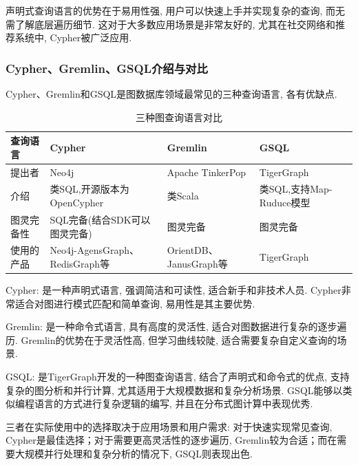 
声明式查询语言的优势在于易用性强, 用户可以快速上手并实现复杂的查询, 而无需了解底层遍历细节. 这对于大多数应用场景是非常友好的, 尤其在社交网络和推荐系统中, Cypher被广泛应用.

\subsubsection*{Cypher、Gremlin、GSQL介绍与对比}
Cypher、Gremlin和GSQL是图数据库领域最常见的三种查询语言, 各有优缺点.
\begin{table}[htbp]
	\centering
	\caption{三种图查询语言对比}
	\begin{tabularx}{\textwidth}{|X|X|X|X| }
		\hline
		查询语言  & Cypher                       & Gremlin              & GSQL                \\
		\hline
		提出者   & Neo4j                        & Apache TinkerPop     & TigerGraph          \\
		\hline
		介绍    & 类SQL,开源版本为OpenCypher         & 类Scala               & 类SQL,支持Map-Ruduce模型 \\
		\hline
		图灵完备性 & SQL完备(结合SDK可以图灵完备)           & 图灵完备                 & 图灵完备                \\
		\hline
		使用的产品 & Neo4j-AgensGraph、RedisGraph等 & OrientDB、JanusGraph等 & TigerGraph          \\
		\hline
	\end{tabularx}%
	\label{tab:addlabel}%
\end{table}%

Cypher: 是一种声明式语言, 强调简洁和可读性, 适合新手和非技术人员. Cypher非常适合对图进行模式匹配和简单查询, 易用性是其主要优势.

Gremlin: 是一种命令式语言, 具有高度的灵活性, 适合对图数据进行复杂的逐步遍历. Gremlin的优势在于灵活性高, 但学习曲线较陡, 适合需要复杂自定义查询的场景.

GSQL: 是TigerGraph开发的一种图查询语言, 结合了声明式和命令式的优点, 支持复杂的图分析和并行计算, 尤其适用于大规模数据和复杂分析场景. GSQL能够以类似编程语言的方式进行复杂逻辑的编写, 并且在分布式图计算中表现优秀.

三者在实际使用中的选择取决于应用场景和用户需求: 对于快速实现常见查询, Cypher是最佳选择；对于需要更高灵活性的逐步遍历, Gremlin较为合适；而在需要大规模并行处理和复杂分析的情况下, GSQL则表现出色.

